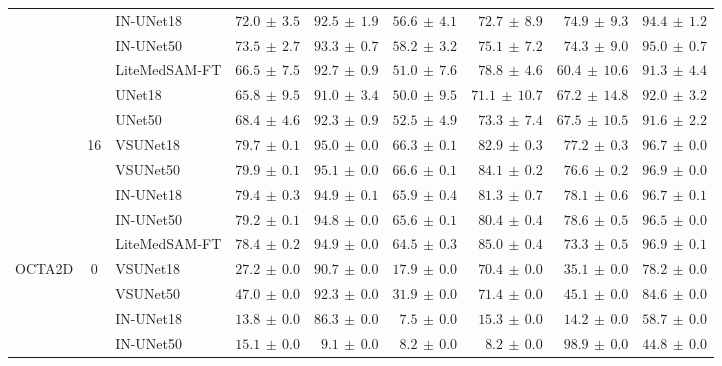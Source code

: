 \documentclass[%
reprint,
nofootinbib,
 amsmath,amssymb,
aps,
superscriptaddress,
showkeys,
longbibliography
]{revtex4-1}
\begin{document}
\begin{table}[t]
\begin{tabular}{l c l r r r r r r}
 &  & IN-UNet18 & $72.0 \,\pm\, 3.5$ & $92.5 \,\pm\, 1.9$ & $56.6 \,\pm\, 4.1$ & $72.7 \,\pm\, 8.9$ & $74.9 \,\pm\, 9.3$ & $94.4 \,\pm\, 1.2$ \\
 &  & IN-UNet50 & $73.5 \,\pm\, 2.7$ & $93.3 \,\pm\, 0.7$ & $58.2 \,\pm\, 3.2$ & $75.1 \,\pm\, 7.2$ & $74.3 \,\pm\, 9.0$ & $95.0 \,\pm\, 0.7$ \\
 &  & LiteMedSAM-FT & $66.5 \,\pm\, 7.5$ & $92.7 \,\pm\, 0.9$ & $51.0 \,\pm\, 7.6$ & $78.8 \,\pm\, 4.6$ & $60.4 \,\pm\, 10.6$ & $91.3 \,\pm\, 4.4$ \\
 &  & UNet18 & $65.8 \,\pm\, 9.5$ & $91.0 \,\pm\, 3.4$ & $50.0 \,\pm\, 9.5$ & $71.1 \,\pm\, 10.7$ & $67.2 \,\pm\, 14.8$ & $92.0 \,\pm\, 3.2$ \\
 &  & UNet50 & $68.4 \,\pm\, 4.6$ & $92.3 \,\pm\, 0.9$ & $52.5 \,\pm\, 4.9$ & $73.3 \,\pm\, 7.4$ & $67.5 \,\pm\, 10.5$ & $91.6 \,\pm\, 2.2$ \\
\cline{2-9}
 & \multirow{5}{*}{16} & VSUNet18 & $79.7 \,\pm\, 0.1$ & $95.0 \,\pm\, 0.0$ & $66.3 \,\pm\, 0.1$ & $82.9 \,\pm\, 0.3$ & $77.2 \,\pm\, 0.3$ & $96.7 \,\pm\, 0.0$ \\
 &  & VSUNet50 & $\mathbf{79.9} \,\pm\, 0.1$ & $95.1 \,\pm\, 0.0$ & $66.6 \,\pm\, 0.1$ & $84.1 \,\pm\, 0.2$ & $76.6 \,\pm\, 0.2$ & $96.9 \,\pm\, 0.0$ \\
 &  & IN-UNet18 & $79.4 \,\pm\, 0.3$ & $94.9 \,\pm\, 0.1$ & $65.9 \,\pm\, 0.4$ & $81.3 \,\pm\, 0.7$ & $78.1 \,\pm\, 0.6$ & $96.7 \,\pm\, 0.1$ \\
 &  & IN-UNet50 & $79.2 \,\pm\, 0.1$ & $94.8 \,\pm\, 0.0$ & $65.6 \,\pm\, 0.1$ & $80.4 \,\pm\, 0.4$ & $78.6 \,\pm\, 0.5$ & $96.5 \,\pm\, 0.0$ \\
 &  & LiteMedSAM-FT & $78.4 \,\pm\, 0.2$ & $94.9 \,\pm\, 0.0$ & $64.5 \,\pm\, 0.3$ & $85.0 \,\pm\, 0.4$ & $73.3 \,\pm\, 0.5$ & $96.9 \,\pm\, 0.1$ \\
\hline
\multirow{19}{*}{OCTA2D} & \multirow{5}{*}{0} & VSUNet18 & $27.2 \,\pm\, 0.0$ & $90.7 \,\pm\, 0.0$ & $17.9 \,\pm\, 0.0$ & $70.4 \,\pm\, 0.0$ & $35.1 \,\pm\, 0.0$ & $78.2 \,\pm\, 0.0$ \\
 &  & VSUNet50 & $\mathbf{47.0} \,\pm\, 0.0$ & $92.3 \,\pm\, 0.0$ & $31.9 \,\pm\, 0.0$ & $71.4 \,\pm\, 0.0$ & $45.1 \,\pm\, 0.0$ & $84.6 \,\pm\, 0.0$ \\
 &  & IN-UNet18 & $13.8 \,\pm\, 0.0$ & $86.3 \,\pm\, 0.0$ & $7.5 \,\pm\, 0.0$ & $15.3 \,\pm\, 0.0$ & $14.2 \,\pm\, 0.0$ & $58.7 \,\pm\, 0.0$ \\
 &  & IN-UNet50 & $15.1 \,\pm\, 0.0$ & $9.1 \,\pm\, 0.0$ & $8.2 \,\pm\, 0.0$ & $8.2 \,\pm\, 0.0$ & $98.9 \,\pm\, 0.0$ & $44.8 \,\pm\, 0.0$ \\

\end{tabular}
\end{table}
\end{document}
